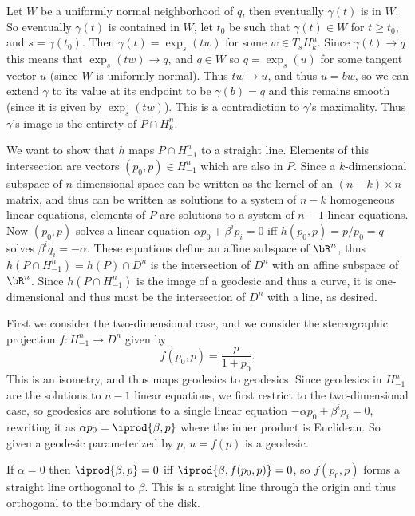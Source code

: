     Let $W$ be a uniformly normal neighborhood of $q$, then eventually $\gamma(t)$ is in $W$.
    So eventually $\gamma(t)$ is contained in $W$, let $t_0$ be such that $\gamma(t)\in W$ for $t\geq t_0$, and $s=\gamma(t_0)$.
    Then $\gamma(t)=\exp_s(tw)$ for some $w\in T_sH^n_k$.
    Since $\gamma(t)\to q$ this means that $\exp_s(tw)\to q$, and $q\in W$ so $q=\exp_s(u)$ for some tangent vector $u$ (since $W$ is uniformly normal).
    Thus $tw\to u$, and thus $u=bw$, so we can extend $\gamma$ to its value at its endpoint to be $\gamma(b)=q$ and this remains smooth (since it is given by $\exp_s(tw)$).
    This is a contradiction to $\gamma$'s maximality.
    Thus $\gamma$'s image is the entirety of $P\cap H^n_k$.

    \item We want to show that $h$ maps $P\cap H^n_{-1}$ to a straight line.
    Elements of this intersection are vectors $(p_0,p)\in H^n_{-1}$ which are also in $P$.
    Since a $k$-dimensional subspace of $n$-dimensional space can be written as the kernel of an $(n-k)\times n$ matrix, and thus can be written as solutions to a system of
    $n-k$ homogeneous linear equations, elements of $P$ are solutions to a system of $n-1$ linear equations.
    Now $(p_0,p)$ solves a linear equation $\alpha p_0+\beta^ip_i=0$ iff $h(p_0,p)=p/p_0=q$ solves $\beta^iq_i=-\alpha$.
    These equations define an affine subspace of $\bR^n$, thus $h(P\cap H^n_{-1})=h(P)\cap D^n$ is the intersection of $D^n$ with an affine subspace of $\bR^n$.
    Since $h(P\cap H^n_{-1})$ is the image of a geodesic and thus a curve, it is one-dimensional and thus must be the intersection of $D^n$ with a line, as desired.

    \item First we consider the two-dimensional case, and we consider the stereographic projection $f\colon H^n_{-1}\to D^n$ given by
    $$ f(p_0,p) = \frac p{1+p_0} . $$
    This is an isometry, and thus maps geodesics to geodesics.
    Since geodesics in $H^n_{-1}$ are the solutions to $n-1$ linear equations, we first restrict to the two-dimensional case, so geodesics are solutions
    to a single linear equation $-\alpha p_0+\beta^ip_i=0$, rewriting it as $\alpha p_0=\iprod{\beta,p}$ where the inner product is Euclidean.
    So given a geodesic parameterized by $p$, $u=f(p)$ is a geodesic.

    If $\alpha=0$ then $\iprod{\beta,p}=0$ iff $\iprod{\beta,f(p_0,p)}=0$, so $f(p_0,p)$ forms a straight line orthogonal to $\beta$.
    This is a straight line through the origin and thus orthogonal to the boundary of the disk.

